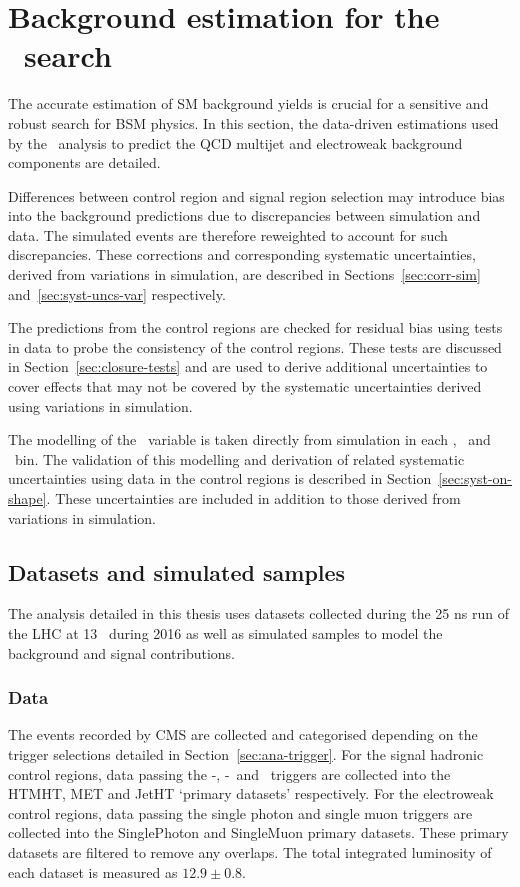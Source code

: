 \chapter{Background estimation for the \alphat~search}
\label{cha:backgroundPrediction}

The accurate estimation of SM background yields is crucial for a sensitive and robust
search for BSM physics. In this section, the data-driven estimations used by
the \alphat~analysis to predict the QCD multijet and electroweak 
background components are detailed. 

Differences between control region and signal 
region selection may introduce bias into the background predictions
due to discrepancies between simulation and data. 
The simulated events are therefore reweighted to account for such discrepancies.
These corrections and corresponding systematic uncertainties, derived
from variations in simulation, are described in Sections~\ref{sec:corr-sim} 
and~\ref{sec:syst-uncs-var} respectively.  

The predictions from the control regions are checked for residual bias 
using tests in data to probe the consistency of the control regions. 
These tests are discussed in Section~\ref{sec:closure-tests} and 
are used to derive additional uncertainties to cover effects 
that may not be covered by the systematic uncertainties derived 
using variations in simulation.

The modelling of the \mht~variable is taken directly from simulation in each \nj, \nb~and \scalht~bin. The validation of this modelling 
and derivation of related systematic uncertainties using data in the 
control regions is described in Section~\ref{sec:syst-on-shape}. These uncertainties 
are included in addition to those derived from variations in simulation.

\section{Datasets and simulated samples}

The analysis detailed in this thesis uses datasets collected during the 25 ns run of the 
LHC at 13 \TeV~during 2016 as well as simulated samples to model the background and
signal contributions.

\subsection{Data}
The events recorded by CMS are collected and categorised depending on the trigger selections
detailed in Section~\ref{sec:ana-trigger}. For the signal hadronic control regions, data passing the \alphat-\scalht,
\mht-\met~and \scalht~triggers are collected into the HTMHT, MET and JetHT `primary datasets' respectively.
For the electroweak control regions, data passing the single photon and single muon triggers are collected 
into the SinglePhoton and SingleMuon primary datasets. These primary datasets are filtered to remove
any overlaps. The total integrated luminosity of each dataset is measured as $12.9\pm0.8$\ifb.

